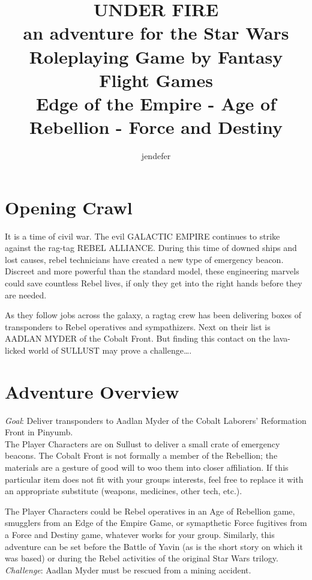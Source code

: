 \documentclass{book}
\title{
UNDER FIRE \\
an adventure for the Star Wars Roleplaying Game by Fantasy Flight Games\\
Edge of the Empire - Age of Rebellion - Force and Destiny \\
}
\author{jendefer}
\begin{document}
\maketitle


\begin{multicols}{2}
\section{Opening Crawl}


It is a time of civil war. The evil GALACTIC EMPIRE continues to strike against the rag-tag REBEL ALLIANCE. During this time of downed ships and lost causes, rebel technicians have created a new type of emergency beacon. Discreet and more powerful than the standard model, these engineering marvels could save countless Rebel lives, if only they get into the right hands before they are needed.

As they follow jobs across the galaxy, a ragtag crew has been delivering boxes of transponders to Rebel operatives and sympathizers. Next on their list is AADLAN MYDER of the Cobalt Front. But finding this contact on the lava-licked world of SULLUST may prove a challenge….



\section{Adventure Overview }

\emph{Goal}: Deliver transponders to Aadlan Myder of the Cobalt Laborers’ Reformation Front in Pinyumb.\\
The Player Characters are on Sullust to deliver a small crate of emergency beacons. The Cobalt Front is not formally a member of the Rebellion; the materials are a gesture of good will to woo them into closer affiliation. If this particular item does not fit with your groups interests, feel free to replace it with an appropriate substitute (weapons, medicines, other tech, etc.).

The Player Characters could be Rebel operatives in an Age of Rebellion game, smugglers from an Edge of the Empire Game, or symapthetic Force fugitives from a Force and Destiny game, whatever works for your group. Similarly, this adventure can be set before the Battle of Yavin (as is the short story on which it was based) or during the Rebel activities of the original Star Wars trilogy.
\emph{Challenge}: Aadlan Myder must be rescued from a mining accident.


\end{multicols}
\end{document}
